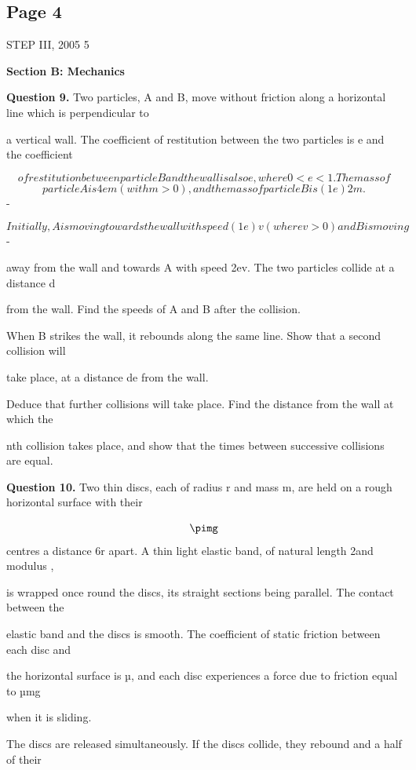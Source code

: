 \documentclass[12pt]{article}
\begin{document}
\subsection*{Page 4}
\begin{flushleft}
STEP III, 2005 5\par
\bigskip\textbf{Section B: Mechanics}\par
\bigskip\textbf{Question 9.} Two particles, A and B, move without friction along a horizontal line which is perpendicular to\par
a vertical wall. The coefficient of restitution between the two particles is e and the coefficient\par
\[of restitution between particle B and the wall is also e, where 0 < e < 1. The mass of\]
\[particle A is 4em (with m > 0), and the mass of particle B is (1 e)2m .\]
-\par
\[Initially, A is moving towards the wall with speed (1 e)v (where v > 0) and B is moving\]
-\par
away from the wall and towards A with speed 2ev. The two particles collide at a distance d\par
from the wall. Find the speeds of A and B after the collision.\par
When B strikes the wall, it rebounds along the same line. Show that a second collision will\par
take place, at a distance de from the wall.\par
Deduce that further collisions will take place. Find the distance from the wall at which the\par
nth collision takes place, and show that the times between successive collisions are equal.\par
\bigskip\textbf{Question 10.} Two thin discs, each of radius r and mass m, are held on a rough horizontal surface with their\par
\[\pimg\]
centres a distance 6r apart. A thin light elastic band, of natural length 2\pir and modulus ,\par
is wrapped once round the discs, its straight sections being parallel. The contact between the\par
elastic band and the discs is smooth. The coefficient of static friction between each disc and\par
the horizontal surface is µ, and each disc experiences a force due to friction equal to µmg\par
when it is sliding.\par
The discs are released simultaneously. If the discs collide, they rebound and a half of their\par

\end{flushleft}
\end{document}

